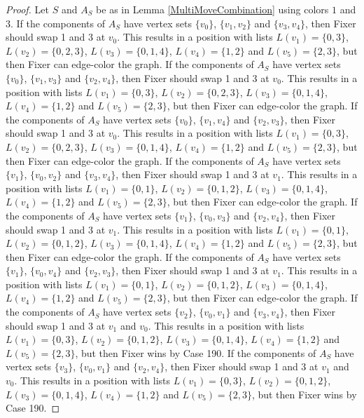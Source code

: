 \documentclass[12pt]{amsart}
\theoremstyle{plain}
\theoremstyle{definition}
\theoremstyle{remark}
\begin{document}
\begin{proof}
Let $S$ and $A_S$ be as in Lemma \ref{MultiMoveCombination} using colors $1$ and $3$. If the components of $A_S$ have vertex sets $\{v_0\}$, $\{v_1, v_2\}$ and $\{v_3, v_4\}$, then Fixer should swap 1 and 3 at $v_0$. This results in a position with lists $L(v_1) = \{0, 3\}$, $L(v_2) = \{0, 2, 3\}$, $L(v_3) = \{0, 1, 4\}$, $L(v_4) = \{1, 2\}$ and $L(v_5) = \{2, 3\}$, but then Fixer can edge-color the graph.
If the components of $A_S$ have vertex sets $\{v_0\}$, $\{v_1, v_3\}$ and $\{v_2, v_4\}$, then Fixer should swap 1 and 3 at $v_0$. This results in a position with lists $L(v_1) = \{0, 3\}$, $L(v_2) = \{0, 2, 3\}$, $L(v_3) = \{0, 1, 4\}$, $L(v_4) = \{1, 2\}$ and $L(v_5) = \{2, 3\}$, but then Fixer can edge-color the graph.
If the components of $A_S$ have vertex sets $\{v_0\}$, $\{v_1, v_4\}$ and $\{v_2, v_3\}$, then Fixer should swap 1 and 3 at $v_0$. This results in a position with lists $L(v_1) = \{0, 3\}$, $L(v_2) = \{0, 2, 3\}$, $L(v_3) = \{0, 1, 4\}$, $L(v_4) = \{1, 2\}$ and $L(v_5) = \{2, 3\}$, but then Fixer can edge-color the graph.
If the components of $A_S$ have vertex sets $\{v_1\}$, $\{v_0, v_2\}$ and $\{v_3, v_4\}$, then Fixer should swap 1 and 3 at $v_1$. This results in a position with lists $L(v_1) = \{0, 1\}$, $L(v_2) = \{0, 1, 2\}$, $L(v_3) = \{0, 1, 4\}$, $L(v_4) = \{1, 2\}$ and $L(v_5) = \{2, 3\}$, but then Fixer can edge-color the graph.
If the components of $A_S$ have vertex sets $\{v_1\}$, $\{v_0, v_3\}$ and $\{v_2, v_4\}$, then Fixer should swap 1 and 3 at $v_1$. This results in a position with lists $L(v_1) = \{0, 1\}$, $L(v_2) = \{0, 1, 2\}$, $L(v_3) = \{0, 1, 4\}$, $L(v_4) = \{1, 2\}$ and $L(v_5) = \{2, 3\}$, but then Fixer can edge-color the graph.
If the components of $A_S$ have vertex sets $\{v_1\}$, $\{v_0, v_4\}$ and $\{v_2, v_3\}$, then Fixer should swap 1 and 3 at $v_1$. This results in a position with lists $L(v_1) = \{0, 1\}$, $L(v_2) = \{0, 1, 2\}$, $L(v_3) = \{0, 1, 4\}$, $L(v_4) = \{1, 2\}$ and $L(v_5) = \{2, 3\}$, but then Fixer can edge-color the graph.
If the components of $A_S$ have vertex sets $\{v_2\}$, $\{v_0, v_1\}$ and $\{v_3, v_4\}$, then Fixer should swap 1 and 3 at $v_1$ and $v_0$. This results in a position with lists $L(v_1) = \{0, 3\}$, $L(v_2) = \{0, 1, 2\}$, $L(v_3) = \{0, 1, 4\}$, $L(v_4) = \{1, 2\}$ and $L(v_5) = \{2, 3\}$, but then Fixer wins by Case 190.
If the components of $A_S$ have vertex sets $\{v_3\}$, $\{v_0, v_1\}$ and $\{v_2, v_4\}$, then Fixer should swap 1 and 3 at $v_1$ and $v_0$. This results in a position with lists $L(v_1) = \{0, 3\}$, $L(v_2) = \{0, 1, 2\}$, $L(v_3) = \{0, 1, 4\}$, $L(v_4) = \{1, 2\}$ and $L(v_5) = \{2, 3\}$, but then Fixer wins by Case 190.

\end{proof}
\end{document}
